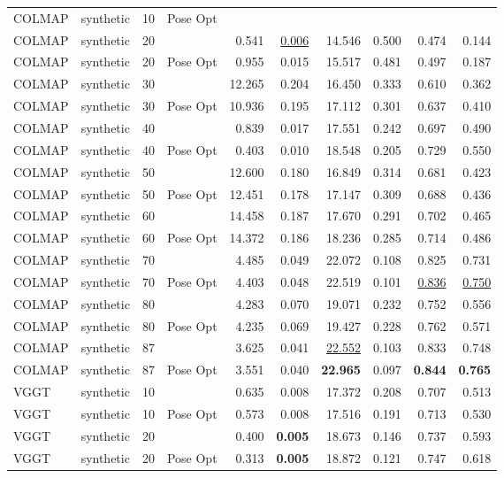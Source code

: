 \begin{table}[H]
\begin{tabular}{llrlrrrrrr}
COLMAP & synthetic & 10 & Pose Opt &  &  &  &  &  &  \\
COLMAP & synthetic & 20 &  & 0.541 & \underline{0.006} & 14.546 & 0.500 & 0.474 & 0.144 \\
COLMAP & synthetic & 20 & Pose Opt & 0.955 & 0.015 & 15.517 & 0.481 & 0.497 & 0.187 \\
COLMAP & synthetic & 30 &  & 12.265 & 0.204 & 16.450 & 0.333 & 0.610 & 0.362 \\
COLMAP & synthetic & 30 & Pose Opt & 10.936 & 0.195 & 17.112 & 0.301 & 0.637 & 0.410 \\
COLMAP & synthetic & 40 &  & 0.839 & 0.017 & 17.551 & 0.242 & 0.697 & 0.490 \\
COLMAP & synthetic & 40 & Pose Opt & 0.403 & 0.010 & 18.548 & 0.205 & 0.729 & 0.550 \\
COLMAP & synthetic & 50 &  & 12.600 & 0.180 & 16.849 & 0.314 & 0.681 & 0.423 \\
COLMAP & synthetic & 50 & Pose Opt & 12.451 & 0.178 & 17.147 & 0.309 & 0.688 & 0.436 \\
COLMAP & synthetic & 60 &  & 14.458 & 0.187 & 17.670 & 0.291 & 0.702 & 0.465 \\
COLMAP & synthetic & 60 & Pose Opt & 14.372 & 0.186 & 18.236 & 0.285 & 0.714 & 0.486 \\
COLMAP & synthetic & 70 &  & 4.485 & 0.049 & 22.072 & 0.108 & 0.825 & 0.731 \\
COLMAP & synthetic & 70 & Pose Opt & 4.403 & 0.048 & 22.519 & 0.101 & \underline{0.836} & \underline{0.750} \\
COLMAP & synthetic & 80 &  & 4.283 & 0.070 & 19.071 & 0.232 & 0.752 & 0.556 \\
COLMAP & synthetic & 80 & Pose Opt & 4.235 & 0.069 & 19.427 & 0.228 & 0.762 & 0.571 \\
COLMAP & synthetic & 87 &  & 3.625 & 0.041 & \underline{22.552} & 0.103 & 0.833 & 0.748 \\
COLMAP & synthetic & 87 & Pose Opt & 3.551 & 0.040 & \textbf{22.965} & 0.097 & \textbf{0.844} & \textbf{0.765} \\
VGGT & synthetic & 10 &  & 0.635 & 0.008 & 17.372 & 0.208 & 0.707 & 0.513 \\
VGGT & synthetic & 10 & Pose Opt & 0.573 & 0.008 & 17.516 & 0.191 & 0.713 & 0.530 \\
VGGT & synthetic & 20 &  & 0.400 & \textbf{0.005} & 18.673 & 0.146 & 0.737 & 0.593 \\
VGGT & synthetic & 20 & Pose Opt & 0.313 & \textbf{0.005} & 18.872 & 0.121 & 0.747 & 0.618 \\

\end{tabular}
\end{table}
